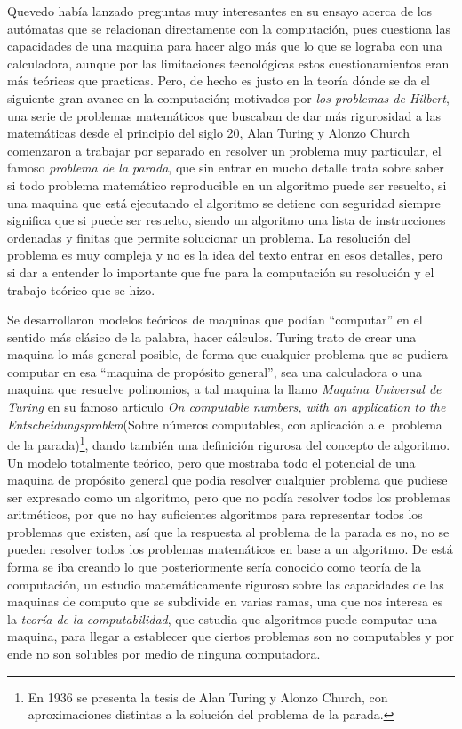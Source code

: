 \documentclass[letterpaper,12pt,oneside]{book}
\begin{document}
		Quevedo había lanzado preguntas muy interesantes en su ensayo acerca de los autómatas que se relacionan directamente con la computación, pues cuestiona
		las capacidades de una maquina para hacer algo más que lo que se lograba con una calculadora, aunque por las limitaciones tecnológicas estos cuestionamientos
		eran más teóricas que practicas. Pero, de hecho es justo en la teoría dónde se da el siguiente gran avance en la computación; motivados por \textit{los problemas
		de Hilbert}, una serie de problemas matemáticos que buscaban de dar más rigurosidad a las matemáticas desde el principio del siglo 20, Alan Turing
		y Alonzo Church comenzaron a trabajar por separado en resolver un problema muy particular, el famoso \textit{problema de la parada}, que sin entrar en mucho
		detalle trata sobre saber si todo problema matemático reproducible en un algoritmo puede ser resuelto, si una maquina que está ejecutando el algoritmo
		se detiene con seguridad siempre significa que si puede ser resuelto, siendo un algoritmo una lista de instrucciones ordenadas y finitas que permite solucionar un 
		problema. La resolución
		del problema es muy compleja y no es la idea del texto entrar en esos detalles, pero si dar a entender lo importante que fue para la computación su resolución
		y el trabajo teórico que se hizo.
		
		Se desarrollaron modelos teóricos de maquinas que podían ``computar'' en el sentido más clásico de la palabra, hacer cálculos. Turing trato de crear
		una maquina lo más general posible, de forma que cualquier problema que se pudiera computar en esa ``maquina de propósito general'', sea una calculadora
		o una maquina que resuelve polinomios, a tal maquina la llamo \textit{Maquina Universal de Turing} en su famoso articulo
		\textit{On computable numbers, with an application to the
		Entscheidungsprobkm}(Sobre números computables, con aplicación a el problema de la parada)\footnote{En 1936 se presenta la tesis de Alan Turing y Alonzo Church, con
		aproximaciones distintas a la solución del problema de la parada.}, dando también una definición rigurosa del concepto
		de algoritmo. Un modelo
		totalmente teórico, pero que mostraba todo el potencial de una maquina de propósito general que podía resolver cualquier problema que pudiese ser expresado
		como un algoritmo, pero que no podía resolver todos los problemas aritméticos, por que no hay suficientes algoritmos para representar todos los
		problemas que existen, así que la respuesta al problema de la parada es no, no se pueden resolver todos los problemas matemáticos en base
		a un algoritmo. De está forma se iba creando lo que posteriormente sería conocido como teoría de la computación, un estudio matemáticamente riguroso
		sobre las capacidades de las maquinas de computo que se subdivide en varias ramas, una que nos interesa es la \textit{teoría de la computabilidad}, que estudia
		que algoritmos puede computar una maquina, para llegar a establecer que ciertos problemas son no computables y por ende no son solubles por medio de
		ninguna computadora\cite[p. 272]{ifrah_universal_2001}.
		
\end{document}
